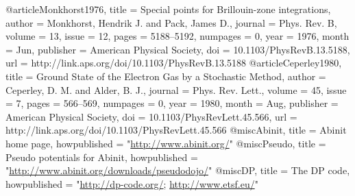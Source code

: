 @article{Monkhorst1976,
  title = {Special points for Brillouin-zone integrations},
  author = {Monkhorst, Hendrik J. and Pack, James D.},
  journal = {Phys. Rev. B},
  volume = {13},
  issue = {12},
  pages = {5188--5192},
  numpages = {0},
  year = {1976},
  month = {Jun},
  publisher = {American Physical Society},
  doi = {10.1103/PhysRevB.13.5188},
  url = {http://link.aps.org/doi/10.1103/PhysRevB.13.5188}
}
@article{Ceperley1980,
  title = {Ground State of the Electron Gas by a Stochastic Method},
  author = {Ceperley, D. M. and Alder, B. J.},
  journal = {Phys. Rev. Lett.},
  volume = {45},
  issue = {7},
  pages = {566--569},
  numpages = {0},
  year = {1980},
  month = {Aug},
  publisher = {American Physical Society},
  doi = {10.1103/PhysRevLett.45.566},
  url = {http://link.aps.org/doi/10.1103/PhysRevLett.45.566}
}
@misc{Abinit,
  title = {Abinit home page},
  howpublished = "\url{http://www.abinit.org/}"
}
@misc{Pseudo,
  title = {Pseudo potentials for Abinit},
  howpublished = "\url{http://www.abinit.org/downloads/pseudodojo/}"
}
@misc{DP,
  title = {The DP code},
  howpublished = "\url{http://dp-code.org/}; \url{http://www.etsf.eu/}"
}